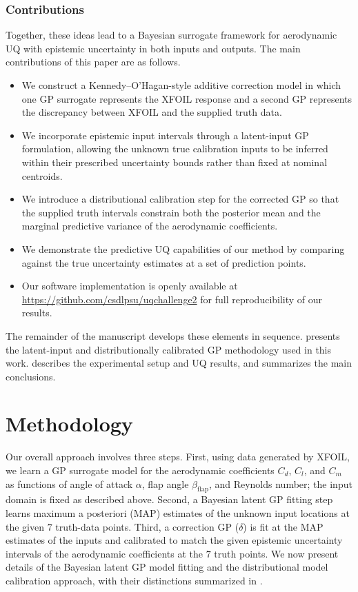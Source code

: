 \documentclass[journal]{new-aiaa}
\begin{document}
\subsubsection{Contributions}
Together, these ideas lead to a Bayesian surrogate framework for aerodynamic UQ with epistemic uncertainty in both inputs and outputs. The main contributions of this paper are as follows.
\begin{itemize}
    \item We construct a Kennedy--O'Hagan-style additive correction model in which one GP surrogate represents the XFOIL response and a second GP represents the discrepancy between XFOIL and the supplied truth data.
    \item We incorporate epistemic input intervals through a latent-input GP formulation, allowing the unknown true calibration inputs to be inferred within their prescribed uncertainty bounds rather than fixed at nominal centroids.
    \item We introduce a distributional calibration step for the corrected GP so that the supplied truth intervals constrain both the posterior mean and the marginal predictive variance of the aerodynamic coefficients.
    \item We demonstrate the predictive UQ capabilities of our method by comparing against the true uncertainty estimates at a set of prediction points.
    \item Our software implementation is openly available at \url{https://github.com/csdlpsu/uqchallenge2} for full reproducibility of our results.
\end{itemize}
The remainder of the manuscript develops these elements in sequence.  presents the latent-input and distributionally calibrated GP methodology used in this work.  describes the experimental setup and UQ results, and  summarizes the main conclusions.

\section{Methodology}
\label{sec:method}
Our overall approach involves three steps. First, using data generated by XFOIL, we learn a GP surrogate model for the aerodynamic coefficients $C_d$, $C_l$, and $C_m$ as functions of angle of attack $\alpha$, flap angle $\beta_{\mathrm{flap}}$, and Reynolds number; the input domain is fixed as described above. Second, a Bayesian latent GP fitting step learns maximum a posteriori (MAP) estimates of the unknown input locations at the given $7$ truth-data points. Third, a correction GP ($\delta$) is fit at the MAP estimates of the inputs and calibrated to match the given epistemic uncertainty intervals of the aerodynamic coefficients at the $7$ truth points. We now present details of the Bayesian latent GP model fitting and the distributional model calibration approach, with their distinctions summarized in .
\end{document}
